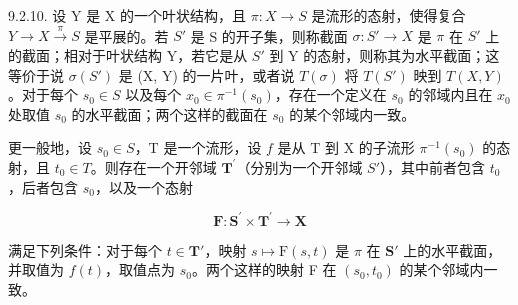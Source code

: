 9.2.10. 设 Y 是 X 的一个叶状结构，且 \(\pi: X \to S\) 是流形的态射，使得复合 \(Y \to X \xrightarrow{\pi} S\) 是平展的。若 \(S'\) 是 S 的开子集，则称截面 \(\sigma: S' \to X\) 是 \(\pi\) 在 \(S'\) 上的截面；相对于叶状结构 Y，若它是从 \(S'\) 到 Y 的态射，则称其为水平截面；这等价于说 \(\sigma(S')\) 是 (X, Y) 的一片叶，或者说 \(T(\sigma)\) 将 \(T(S')\) 映到 \(T(X, Y)\)。对于每个 \(s_0 \in S\) 以及每个 \(x_0 \in \pi^{-1}(s_0)\)，存在一个定义在 \(s_0\) 的邻域内且在 \(x_0\) 处取值 \(s_0\) 的水平截面；两个这样的截面在 \(s_0\) 的某个邻域内一致。

更一般地，设 \(s_{0}\in S\)，T 是一个流形，设 \(f\) 是从 T 到 X 的子流形 \(\pi^{-1}(s_{0})\) 的态射，且 \(t_{0}\in T\)。则存在一个开邻域 \(\mathbf{T}^{\prime}\)（分别为一个开邻域 \(S'\)），其中前者包含 \(t_{0}\)，后者包含 \(s_{0}\)，以及一个态射

\[
\mathbf {F}: \mathbf {S} ^ {\prime} \times \mathbf {T} ^ {\prime} \rightarrow \mathbf {X}
\]

满足下列条件：对于每个 \(t \in \mathbf{T}'\)，映射 \(s \mapsto \mathrm{F}(s, t)\) 是 \(\pi\) 在 \(\mathbf{S}'\) 上的水平截面，并取值为 \(f(t)\)，取值点为 \(s_0\)。两个这样的映射 F 在 \((s_0, t_0)\) 的某个邻域内一致。

